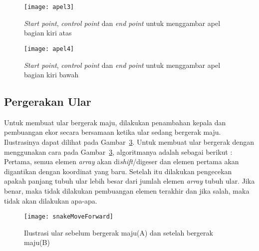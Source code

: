 \begin{figure}[H]
	\centering  
	\texttt{[image: apel3]}  
	\caption[\textit{Start point}, \textit{control point} dan \textit{end point} untuk menggambar apel bagian kiri atas]{\textit{Start point}, \textit{control point} dan \textit{end point} untuk menggambar apel bagian kiri atas}
	\label{fig:apel3} 
\end{figure}

\begin{figure}[H]
	\centering  
	\texttt{[image: apel4]}  
	\caption[\textit{Start point}, \textit{control point} dan \textit{end point} untuk menggambar apel bagian kiri bawah]{\textit{Start point}, \textit{control point} dan \textit{end point} untuk menggambar apel bagian kiri bawah}
	\label{fig:apel4} 
\end{figure}

\subsection{Pergerakan Ular}
Untuk membuat ular bergerak maju, dilakukan penambahan kepala dan pembuangan ekor secara bersamaan ketika ular sedang bergerak maju. Ilustrasinya dapat dilihat pada Gambar~\ref{fig:snakeMoveForward}. Untuk membuat ular bergerak dengan menggunakan cara pada Gambar~\ref{fig:snakeMoveForward}, algoritmanya adalah sebagai berikut : Pertama, semua elemen \textit{array} akan di\textit{shift}/digeser dan elemen pertama akan digantikan dengan koordinat yang baru. Setelah itu dilakukan pengecekan apakah panjang tubuh ular lebih besar dari jumlah elemen \textit{array} tubuh ular. Jika benar, maka tidak dilakukan pembuangan elemen terakhir dan jika salah, maka tidak akan dilakukan apa-apa. 

\begin{figure}[H]
	\centering  
	\texttt{[image: snakeMoveForward]}  
	\caption[Ilustrasi ular sebelum bergerak maju(A) dan setelah bergerak maju(B)]{Ilustrasi ular sebelum bergerak maju(A) dan setelah bergerak maju(B)}
	\label{fig:snakeMoveForward} 
\end{figure}

